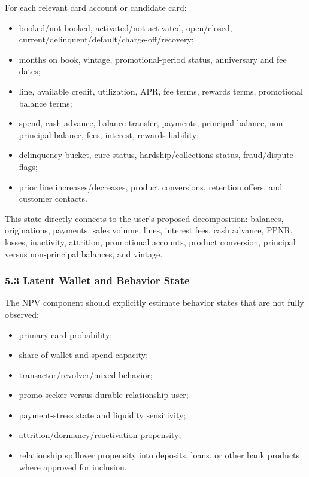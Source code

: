 \documentclass[
]{article}
\providecommand{\tightlist}{%
  \setlength{\itemsep}{0pt}\setlength{\parskip}{0pt}}
\begin{document}
For each relevant card account or candidate card:

\begin{itemize}
\tightlist
\item
  booked/not booked, activated/not activated, open/closed,
  current/delinquent/default/charge-off/recovery;
\item
  months on book, vintage, promotional-period status, anniversary and
  fee dates;
\item
  line, available credit, utilization, APR, fee terms, rewards terms,
  promotional balance terms;
\item
  spend, cash advance, balance transfer, payments, principal balance,
  non-principal balance, fees, interest, rewards liability;
\item
  delinquency bucket, cure status, hardship/collections status,
  fraud/dispute flags;
\item
  prior line increases/decreases, product conversions, retention offers,
  and customer contacts.
\end{itemize}

This state directly connects to the user's proposed decomposition:
balances, originations, payments, sales volume, lines, interest fees,
cash advance, PPNR, losses, inactivity, attrition, promotional accounts,
product conversion, principal versus non-principal balances, and
vintage.

\hypertarget{latent-wallet-and-behavior-state}{%
\subsubsection{5.3 Latent Wallet and Behavior
State}\label{latent-wallet-and-behavior-state}}

The NPV component should explicitly estimate behavior states that are
not fully observed:

\begin{itemize}
\tightlist
\item
  primary-card probability;
\item
  share-of-wallet and spend capacity;
\item
  transactor/revolver/mixed behavior;
\item
  promo seeker versus durable relationship user;
\item
  payment-stress state and liquidity sensitivity;
\item
  attrition/dormancy/reactivation propensity;
\item
  relationship spillover propensity into deposits, loans, or other bank
  products where approved for inclusion.
\end{itemize}
\end{document}
